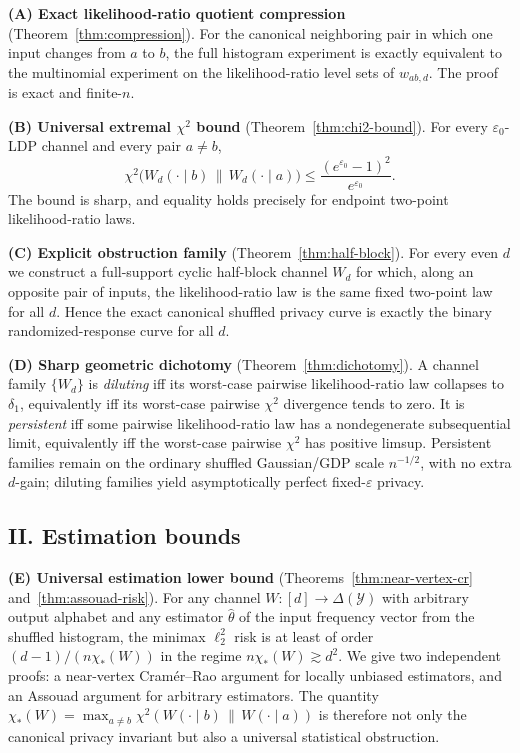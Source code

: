 \documentclass[11pt]{amsart}
\numberwithin{equation}{section}
\theoremstyle{definition}
\begin{document}
\smallskip
\noindent
\textbf{(A) Exact likelihood-ratio quotient compression} (Theorem~\ref{thm:compression}).
For the canonical neighboring pair in which one input changes from $a$ to $b$,
the full histogram experiment is exactly equivalent to the multinomial experiment on the
likelihood-ratio level sets of $w_{ab,d}$.  The proof is exact and finite-$n$.

\smallskip
\noindent
\textbf{(B) Universal extremal $\chi^2$ bound} (Theorem~\ref{thm:chi2-bound}).
For every $\varepsilon_0$-LDP channel and every pair $a \neq b$,
\[
\chi^2\!\bigl(W_d(\cdot\mid b)\,\|\,W_d(\cdot\mid a)\bigr)
\le \frac{(e^{\varepsilon_0}-1)^2}{e^{\varepsilon_0}}.
\]
The bound is sharp, and equality holds precisely for endpoint two-point likelihood-ratio laws.

\smallskip
\noindent
\textbf{(C) Explicit obstruction family} (Theorem~\ref{thm:half-block}).
For every even $d$ we construct a full-support cyclic half-block channel $W_d$ for which,
along an opposite pair of inputs, the likelihood-ratio law is the same fixed two-point law for all $d$.
Hence the exact canonical shuffled privacy curve is exactly the binary randomized-response curve for all $d$.

\smallskip
\noindent
\textbf{(D) Sharp geometric dichotomy} (Theorem~\ref{thm:dichotomy}).
A channel family $\{W_d\}$ is \emph{diluting} iff its worst-case pairwise likelihood-ratio law collapses to
$\delta_1$, equivalently iff its worst-case pairwise $\chi^2$ divergence tends to zero.
It is \emph{persistent} iff some pairwise likelihood-ratio law has a nondegenerate subsequential limit,
equivalently iff the worst-case pairwise $\chi^2$ has positive limsup.
Persistent families remain on the ordinary shuffled Gaussian/GDP scale $n^{-1/2}$, with no extra
$d$-gain; diluting families yield asymptotically perfect fixed-$\varepsilon$ privacy.

\subsection*{II. Estimation bounds}

\smallskip
\noindent
\textbf{(E) Universal estimation lower bound}
(Theorems~\ref{thm:near-vertex-cr} and~\ref{thm:assouad-risk}).
For any channel $W:[d]\to\Delta(\mathcal Y)$ with arbitrary output alphabet and any estimator
$\widehat\theta$ of the input frequency vector from the shuffled histogram,
the minimax $\ell_2^2$ risk is at least of order $(d-1)/(n\chi_\ast(W))$
in the regime $n\chi_\ast(W)\gtrsim d^2$.
We give two independent proofs: a near-vertex Cram\'er--Rao argument for locally unbiased
estimators, and an Assouad argument for arbitrary estimators.
The quantity $\chi_\ast(W)=\max_{a\neq b}\chi^2(W(\cdot\mid b)\,\|\,W(\cdot\mid a))$ is therefore
not only the canonical privacy invariant but also a universal statistical obstruction.
\end{document}
